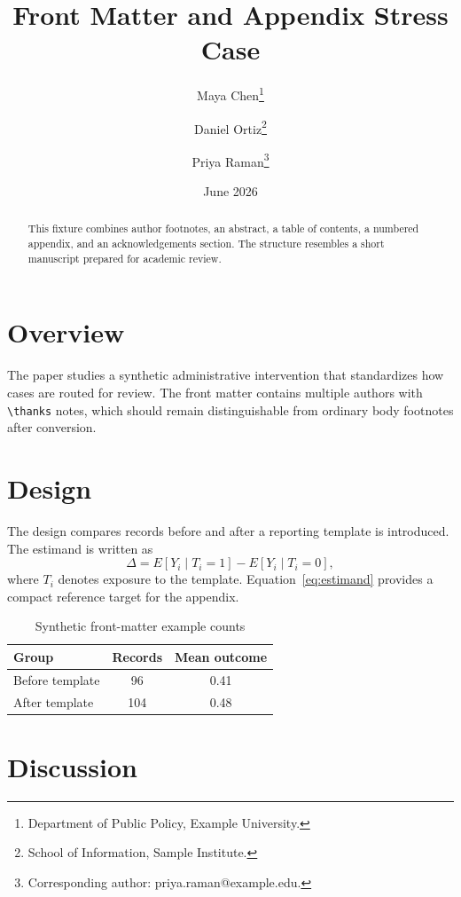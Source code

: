 \documentclass[11pt]{article}
\title{Front Matter and Appendix Stress Case}
\author{Maya Chen\thanks{Department of Public Policy, Example University.}
\and Daniel Ortiz\thanks{School of Information, Sample Institute.}
\and Priya Raman\thanks{Corresponding author: priya.raman@example.edu.}}
\date{June 2026}
\begin{document}
\maketitle

\begin{abstract}
This fixture combines author footnotes, an abstract, a table of contents, a
numbered appendix, and an acknowledgements section. The structure resembles a
short manuscript prepared for academic review.
\end{abstract}

\tableofcontents
\newpage

\section{Overview}
\label{sec:overview}

The paper studies a synthetic administrative intervention that standardizes how
cases are routed for review. The front matter contains multiple authors with
\texttt{\textbackslash thanks} notes, which should remain distinguishable from
ordinary body footnotes after conversion.

\section{Design}
\label{sec:design}

The design compares records before and after a reporting template is introduced.
The estimand is written as
\begin{equation}
\Delta = E[Y_i \mid T_i=1] - E[Y_i \mid T_i=0],
\label{eq:estimand}
\end{equation}
where $T_i$ denotes exposure to the template. Equation~\ref{eq:estimand} provides
a compact reference target for the appendix.

\begin{table}[htbp]
\centering
\caption{Synthetic front-matter example counts}
\label{tab:counts}
\begin{tabular}{lcc}
\toprule
Group & Records & Mean outcome \\
\midrule
Before template & 96 & 0.41 \\
After template & 104 & 0.48 \\
\bottomrule
\end{tabular}
\end{table}

\section{Discussion}
\label{sec:discussion}
\end{document}

